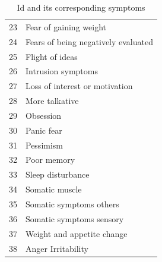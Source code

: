 \begin{table}[th]
\begin{tabular}{m{0.4cm}m{6cm}}
    23&Fear of gaining weight	\\
    24&Fears of being negatively evaluated	\\
    25&Flight of ideas	\\
    26&Intrusion symptoms	\\
    27&Loss of interest or motivation	\\
    28&More talkative\\
    29&Obsession	\\
    30&Panic fear	\\
    31&Pessimism	\\
    32&Poor memory	\\
    33&Sleep disturbance	\\
    34&Somatic muscle		\\
    35&Somatic symptoms others		\\
    36&Somatic symptoms sensory	\\
    37&Weight and appetite change	\\
    38&Anger Irritability	\\
    \hline
    \end{tabular}
    \caption{Id and its corresponding symptoms}
    \label{tab:symp_id}
\end{table}
